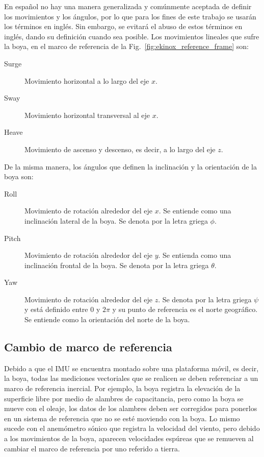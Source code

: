 \documentclass[11pt]{article}
\begin{document}
En español no hay una manera generalizada y comúnmente aceptada de definir los
movimientos y los ángulos, por lo que para los fines de este trabajo se usarán
los términos en inglés. Sin embargo, se evitará el abuso de estos términos en
inglés, dando su definición cuando sea posible. Los movimientos lineales que
sufre la boya, en el marco de referencia de la
Fig.~\ref{fig:ekinox_reference_frame} son:

\begin{description}
  \item[Surge] Movimiento horizontal a lo largo del eje $x$.
  \item[Sway] Movimiento horizontal transversal al eje $x$.
  \item[Heave] Movimiento de ascenso y descenso, es decir,
    a lo largo del eje $z$.
\end{description}

De la misma manera, los ángulos que definen la inclinación y la orientación de
la boya son:

\begin{description}
  \item[Roll] Movimiento de rotación alrededor del eje $x$.  Se entiende como
    una inclinación lateral de la boya. Se denota por la letra griega $\phi$.
  \item[Pitch] Movimiento de rotación alrededor del eje $y$. Se entienda como
    una inclinación frontal de la boya. Se denota por la letra griega $\theta$.
  \item[Yaw] Movimiento de rotación alrededor del eje $z$. Se denota por la
    letra griega $\psi$ y está definido entre $0$ y $2\pi$ y su punto de
    referencia es el norte geográfico. Se entiende como la orientación del norte
    de la boya.
\end{description}

\subsection{Cambio de marco de referencia}
\label{sub:cambio_de_marco_de_referencia}

Debido a que el IMU se encuentra montado sobre una plataforma móvil, es decir,
la boya, todas las mediciones vectoriales que se realicen se deben referenciar a
un marco de referencia inercial. Por ejemplo, la boya registra la elevación de
la superficie libre por medio de alambres de capacitancia, pero como la boya se
mueve con el oleaje, los datos de los alambres deben ser corregidos para
ponerlos en un sistema de referencia que no se esté moviendo con la boya. Lo
mismo sucede con el anemómetro sónico que registra la velocidad del viento, pero
debido a los movimientos de la boya, aparecen velocidades espúreas que se
remueven al cambiar el marco de referencia por uno referido a tierra.
\end{document}
